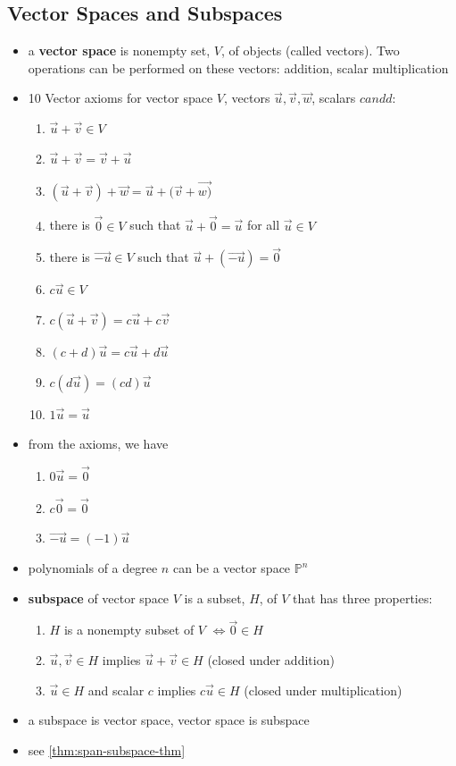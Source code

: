 \documentclass[a4paper,12pt]{article}
\theoremstyle{definition}
\theoremstyle{definition}
\begin{document}
	\subsection{Vector Spaces and Subspaces}
	\begin{itemize}
		\item a \textbf{vector space} is nonempty set, $V$, of objects (called vectors). Two operations can be performed on these vectors: addition, scalar multiplication
		
		\item 10 Vector axioms for vector space $V$, vectors $\vec{u}, \vec{v}, \vec{w}$, scalars $c and d$:
		
		\begin{enumerate}
			\item $\vec{u} + \vec{v} \in V$
			\item $\vec{u} + \vec{v} = \vec{v} + \vec{u}$
			\item $(\vec{u} + \vec{v}) + \vec{w} = \vec{u} + (\vec{v} + \vec{w)}$
			\item there is $\vec{0} \in V$ such that $\vec{u} + \vec{0} = \vec{u}$ for all $\vec{u} \in V$
			\item there is $\vec{-u} \in V$ such that $\vec{u} + (\vec{-u}) = \vec{0}$
			\item $c\vec{u} \in V$
			\item $c(\vec{u} + \vec{v}) = c\vec{u} + c\vec{v}$
			\item $(c + d)\vec{u} = c\vec{u} + d\vec{u}$
			\item $c(d\vec{u}) = (cd)\vec{u}$
			\item $1\vec{u} = \vec{u}$
		\end{enumerate}
		
		\item from the axioms, we have
		\begin{enumerate}
			\item $0\vec{u} = \vec{0}$
			\item $c\vec{0} = \vec{0}$
			\item $\vec{-u} = (-1)\vec{u}$
		\end{enumerate}
		
		\item polynomials of a degree $n$ can be a vector space $\mathbb{P}^n$
		
		\item \textbf{subspace} of vector space $V$ is a subset, $H$, of $V$ that has three properties:
		\begin{enumerate}
			\item $H$ is a nonempty subset of $V$ $\Leftrightarrow \vec{0} \in H$
			\item $\vec{u}, \vec{v} \in H$ implies $\vec{u} + \vec{v} \in H$ (closed under addition)
			\item $\vec{u}\in H$ and scalar $c$ implies $c\vec{u} \in H$ (closed under multiplication)
		\end{enumerate}
		
		\item a subspace is vector space, vector space is subspace
		
		\item see \autoref{thm:span-subspace-thm}
	\end{itemize}
	
\end{document}
